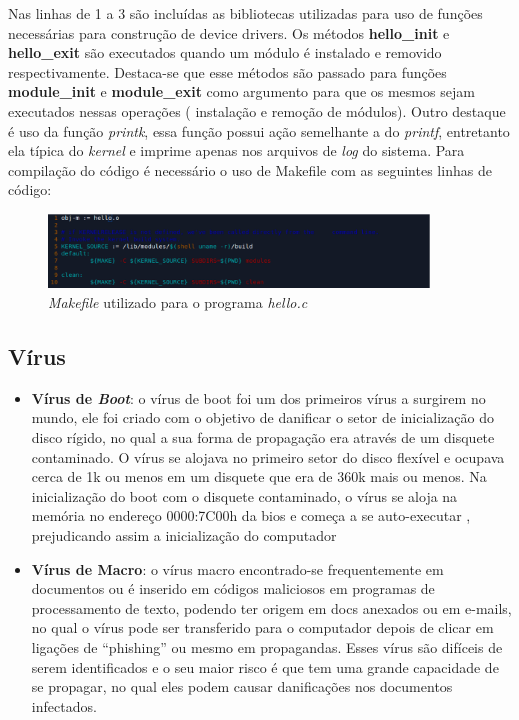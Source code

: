 Nas linhas de 1 a 3 são incluídas as bibliotecas utilizadas para uso de funções necessárias para 
construção de device drivers. Os métodos \textbf{hello\_init} e \textbf{hello\_exit} são executados quando um módulo 
é instalado e removido respectivamente. Destaca-se que esse métodos são passado para funções \textbf{ module\_init}
e \textbf{module\_exit} como argumento para que os mesmos sejam executados nessas operações ( instalação e 
remoção de módulos). Outro destaque é uso da função \textit{printk}, essa função possui ação semelhante a do \textit{printf}, 
entretanto ela típica do \textit{kernel} e imprime apenas nos arquivos de \textit{log} do sistema. Para compilação do código é
necessário o uso de Makefile com as seguintes linhas de código:

\begin{figure}[H]
  \centering
  \caption{ \textit{Makefile} utilizado para o programa \textit{hello.c} }
  \label{fig:usblinux}
  \includegraphics[width=0.9\textwidth]{figure/makefile.eps}
\end{figure}

\subsection{Vírus}

\begin{itemize}
  \item \textbf{Vírus de \textit{Boot}}: o vírus de boot foi um dos primeiros vírus a surgirem no mundo,
    ele foi criado com o objetivo de danificar o setor de inicialização do disco rígido,
    no qual a sua forma de propagação era através de um disquete contaminado. O vírus se
    alojava no primeiro setor do disco flexível e ocupava cerca de 1k ou menos em um
    disquete que era de 360k mais ou menos. Na inicialização do boot com o disquete
    contaminado, o vírus se aloja na memória no endereço 0000:7C00h da bios e começa
    a se auto-executar , prejudicando assim a inicialização do computador

  \item \textbf{Vírus de Macro}: o vírus macro encontrado-se frequentemente em documentos ou é
    inserido em códigos maliciosos em programas de processamento de texto, podendo ter
    origem em docs anexados ou em e-mails, no qual o vírus pode ser transferido para o
    computador depois de clicar em ligações de “phishing” ou mesmo em propagandas. Esses
    vírus são difíceis de serem identificados e o seu maior risco é que tem uma grande
    capacidade de se propagar, no qual eles podem causar danificações nos documentos infectados.
\end{itemize}

